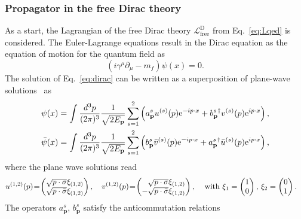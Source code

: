 \subsubsection*{Propagator in the free Dirac theory}
As a start, the Lagrangian of the free Dirac theory $\mathcal{L}_{\text{free}}^{\text{D}}$ from Eq.~\eqref{eq:Lqed} is considered. The Euler-Lagrange equations result in the Dirac equation as the equation of motion for the quantum field as
\begin{equation}
\label{eq:dirac}
\left( i\gamma^\mu \partial_\mu -m_f \right) \psi(x) = 0.
\end{equation}
The solution of Eq.~\eqref{eq:dirac} can be written as a superposition of plane-wave solutions~\mbox{\cite[Sec.~3.3.]{peskin1995}} as
\begin{alignat}{2}
& \psi(x) = 
\int \frac{\mathrm{}d^3p}{(2\pi)^3}\frac{1}{\sqrt{2E_\mathbf{p}}} 
\sum_{s=1}^{2} \left(a^s_\mathbf{p}u^{(s)}(p) \text{e}^{-ip\cdot x} + b^{s\,\dagger}_{\mathbf{p}}v^{(s)}(p) \text{e}^{ip\cdot x} \right),\\
& \bar{\psi}(x) = 
\int \frac{\mathrm{}d^3p}{(2\pi)^3}\frac{1}{\sqrt{2E_\mathbf{p}}} 
\sum_{s=1}^{2} \left(b^s_\mathbf{p}\bar{v}^{(s)}(p) \text{e}^{-ip\cdot x} + a^{s\,\dagger}_{\mathbf{p}}\bar{u}^{(s)}(p) \text{e}^{ip\cdot x} \right),\\
\end{alignat}
where the plane wave solutions read
\begin{alignat}{4}
& u^{(1,2)}(p)\hspace{-2pt}=\hspace{-2pt} \begin{pmatrix}\sqrt{p\cdot \sigma}\xi_{(1,2)}\\\sqrt{p\cdot \bar{\sigma}}\xi_{(1,2)}\end{pmatrix},\, && 
v^{(1,2)}(p)\hspace{-2pt}=\hspace{-2pt} \begin{pmatrix}\phantom{-}\sqrt{p\cdot \sigma}\xi_{(1,2)}\\-\sqrt{p\cdot \bar{\sigma}}\xi_{(1,2)}\end{pmatrix}, &\text{ with }
&\xi_1=\begin{pmatrix}1\\0\end{pmatrix},\,
\xi_2=\begin{pmatrix}0\\1\end{pmatrix}.\notag
\end{alignat}
The operators $a^{s}_{\mathbf{p}}$, $b^{s}_{\mathbf{p}}$ satisfy the anticommutation relations
